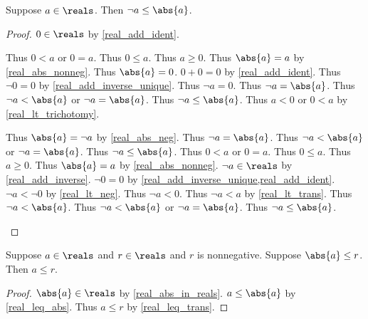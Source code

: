 \begin{theorem}\label{real_neg_leq_abs}
    Suppose $a\in\reals$.
    Then $\neg{a} \leq \abs{a}$.
\end{theorem}
\begin{proof}
    $0\in\reals$ by \cref{real_add_ident}.
    \begin{byCase}
        Thus $0 < a$ or $0 = a$.
        Thus $0 \leq a$.
        Thus $a \geq 0$.
        Thus $\abs{a} = a$ by \cref{real_abs_nonneg}.
        Thus $\abs{a} = 0$.
        $0 + 0 = 0$ by \cref{real_add_ident}.
        Thus $\neg{0} = 0$ by \cref{real_add_inverse_unique}.
        Thus $\neg{a} = 0$.
        Thus $\neg{a} = \abs{a}$.
        Thus $\neg{a} < \abs{a}$ or $\neg{a} = \abs{a}$.
        Thus $\neg{a} \leq \abs{a}$.
        Thus $a < 0$ or $0 < a$ by \cref{real_lt_trichotomy}.
        \begin{byCase}
            Thus $\abs{a} = \neg{a}$ by \cref{real_abs_neg}.
            Thus $\neg{a} = \abs{a}$.
            Thus $\neg{a} < \abs{a}$ or $\neg{a} = \abs{a}$.
            Thus $\neg{a} \leq \abs{a}$.
            Thus $0 < a$ or $0 = a$.
            Thus $0 \leq a$.
            Thus $a \geq 0$.
            Thus $\abs{a} = a$ by \cref{real_abs_nonneg}.
            $\neg{a}\in\reals$ by \cref{real_add_inverse}.
            $\neg{0} = 0$ by \cref{real_add_inverse_unique,real_add_ident}.
            $\neg{a} < \neg{0}$ by \cref{real_lt_neg}.
            Thus $\neg{a} < 0$.
            Thus $\neg{a} < a$ by \cref{real_lt_trans}.
            Thus $\neg{a} < \abs{a}$.
            Thus $\neg{a} < \abs{a}$ or $\neg{a} = \abs{a}$.
            Thus $\neg{a} \leq \abs{a}$.
        \end{byCase}
    \end{byCase}
\end{proof}

\begin{theorem}\label{real_abs_leq_imp_right_bound}
    Suppose $a\in\reals$ and $r\in\reals$ and $r$ is nonnegative.
    Suppose $\abs{a} \leq r$.
    Then $a \leq r$.
\end{theorem}
\begin{proof}
    $\abs{a}\in\reals$ by \cref{real_abs_in_reals}.
    $a \leq \abs{a}$ by \cref{real_leq_abs}.
    Thus $a \leq r$ by \cref{real_leq_trans}.
\end{proof}

